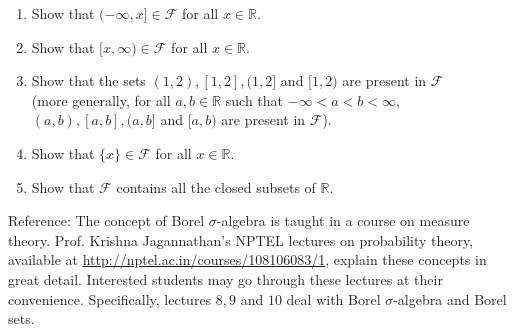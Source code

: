 \documentclass[11pt]{article}
\begin{document}
\begin{enumerate}
\begin{enumerate}
	\item Show that $(-\infty,x]\in \mathcal{F}$ for all $x\in \mathbb{R}$.
	\item Show that $[x,\infty)\in \mathcal{F}$ for all $x\in \mathbb{R}$.
	\item Show that the sets $(1,2),[1,2],(1,2]$ and $[1,2)$ are present in $\mathcal{F}$\\ (more generally, for all $a,b\in \mathbb{R}$ such that $-\infty<a<b<\infty$, $(a,b),[a,b],(a,b]$ and $[a,b)$ are present in $\mathcal{F}$).
	\item Show that $\{x\}\in \mathcal{F}$ for all $x\in \mathbb{R}$.
	\item Show that $\mathcal{F}$ contains all the closed subsets of $\mathbb{R}$.
\end{enumerate}
\end{enumerate}
\vspace{0.5cm}
Reference: The concept of Borel $\sigma$-algebra is taught in a course on measure theory. Prof. Krishna Jagannathan's NPTEL lectures on probability theory, available at \url{http://nptel.ac.in/courses/108106083/1}, explain these concepts in great detail. Interested students may go through these lectures at their convenience. Specifically, lectures $8,9$ and $10$ deal with Borel $\sigma$-algebra and Borel sets.
\end{document}
